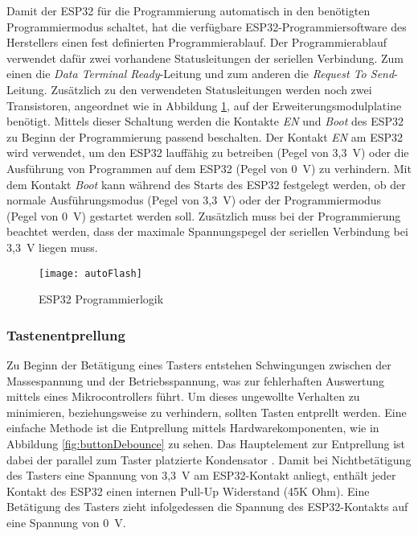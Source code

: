 Damit der ESP32 für die Programmierung automatisch in den benötigten Programmiermodus schaltet, hat die verfügbare ESP32-Programmiersoftware des Herstellers einen fest definierten Programmierablauf.  Der Programmierablauf verwendet dafür zwei vorhandene Statusleitungen der seriellen Verbindung. Zum einen die \textit{Data Terminal Ready}-Leitung und zum anderen die \textit{Request To Send}-Leitung. Zusätzlich zu den verwendeten Statusleitungen werden noch zwei Transistoren, angeordnet wie in Abbildung \ref{fig:autoFlash}, auf der Erweiterungsmodulplatine benötigt. Mittels dieser Schaltung werden die Kontakte \textit{EN} und \textit{Boot} des ESP32 zu Beginn der Programmierung passend beschalten. Der Kontakt \textit{EN} am ESP32 wird verwendet, um den ESP32 lauffähig zu betreiben (Pegel von 3,3~V) oder die Ausführung von Programmen auf dem ESP32 (Pegel von 0~V) zu verhindern. Mit dem Kontakt \textit{Boot} kann während des Starts des ESP32 festgelegt werden, ob der normale Ausführungsmodus (Pegel von 3,3~V) oder der Programmiermodus (Pegel von 0~V) gestartet werden soll. Zusätzlich muss bei der Programmierung beachtet werden, dass der maximale Spannungspegel der seriellen Verbindung bei 3,3~V liegen muss. \cite{espFlashTool}

\begin{figure}[h]
    \centering
    \texttt{[image: autoFlash]}
    \caption{ESP32 Programmierlogik}
    \label{fig:autoFlash}
\end{figure}

\subsubsection{Tastenentprellung}
Zu Beginn der Betätigung eines Tasters entstehen Schwingungen zwischen der Massespannung und der Betriebsspannung, was zur fehlerhaften Auswertung mittels eines Mikrocontrollers führt. Um dieses ungewollte Verhalten zu minimieren, beziehungsweise zu verhindern, sollten Tasten entprellt werden. Eine einfache Methode ist die Entprellung mittels Hardwarekomponenten, wie in Abbildung \ref{fig:buttonDebounce} zu sehen. Das Hauptelement zur Entprellung ist dabei der parallel zum Taster platzierte Kondensator \cite{debounceButton}. Damit bei Nichtbetätigung des Tasters eine Spannung von 3,3~V am ESP32-Kontakt anliegt, enthält jeder Kontakt des ESP32 einen internen Pull-Up Widerstand (45K Ohm). Eine Betätigung des Tasters zieht infolgedessen die Spannung des ESP32-Kontakts auf eine Spannung von 0~V.

